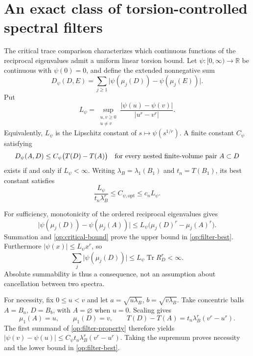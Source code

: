 \documentclass[11pt,reqno]{amsart}
\numberwithin{equation}{section}
\newcommand{\R}{\mathbb R}
\newcommand{\abs}[1]{\lvert#1\rvert}
\DeclareMathOperator{\Tr}{Tr}
\begin{document}
\section{An exact class of torsion-controlled spectral filters}
\label{op:filters}

The critical trace comparison characterizes which continuous
functions of the reciprocal eigenvalues admit a uniform linear
torsion bound.  Let $\psi:[0,\infty)\to\R$ be continuous with
$\psi(0)=0$, and define the extended nonnegative sum
\[
 D_\psi(D,E)=\sum_{j\ge1}
       \abs{\psi(\mu_j(D))-\psi(\mu_j(E))}.
\]
Put
\begin{equation}\label{op:filter-L}
 L_\psi=\sup_{\substack{u,v\ge0\\u\ne v}}
       \frac{\abs{\psi(u)-\psi(v)}}{\abs{u^r-v^r}}.
\end{equation}
Equivalently, $L_\psi$ is the Lipschitz constant of
$s\mapsto\psi(s^{1/r})$.  A finite constant $C_\psi$ satisfying
\begin{equation}\label{op:filter-property}
 D_\psi(A,D)\le C_\psi\bigl(T(D)-T(A)\bigr)
 \quad\hbox{for every nested finite-volume pair }A\subset D
\end{equation}
exists if and only if $L_\psi<\infty$.
Writing $\lambda_B=\lambda_1(B_1)$ and $t_n=T(B_1)$, its best
constant satisfies
\begin{equation}\label{op:filter-best}
 \frac{L_\psi}{t_n\lambda_B^r}
       \le C_{\psi,\mathrm{opt}}\le c_nL_\psi.
\end{equation}

For sufficiency, monotonicity of the ordered reciprocal eigenvalues
gives
\[
 \abs{\psi(\mu_j(D))-\psi(\mu_j(A))}
 \le L_\psi\bigl(\mu_j(D)^r-\mu_j(A)^r\bigr).
\]
Summation and \eqref{op:critical-bound} prove the upper bound in
\eqref{op:filter-best}.  Furthermore
$\abs{\psi(x)}\le L_\psi x^r$, so
\begin{equation}\label{op:filter-summable}
 \sum_j\abs{\psi(\mu_j(D))}
 \le L_\psi\Tr R_D^r<\infty.
\end{equation}
Absolute summability is thus a consequence, not an assumption about
cancellation between two spectra.

For necessity, fix $0\le u<v$ and let
$a=\sqrt{u\lambda_B}$, $b=\sqrt{v\lambda_B}$.
Take concentric balls $A=B_a$, $D=B_b$, with $A=\varnothing$
when $u=0$.  Scaling gives
\[
 \mu_1(A)=u,\qquad\mu_1(D)=v,\qquad
 T(D)-T(A)=t_n\lambda_B^r(v^r-u^r).
\]
The first summand of \eqref{op:filter-property} therefore yields
$\abs{\psi(v)-\psi(u)}
 \le C_\psi t_n\lambda_B^r(v^r-u^r)$.
Taking the supremum proves necessity and the lower bound in
\eqref{op:filter-best}.
\end{document}
